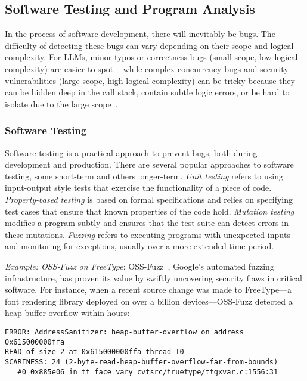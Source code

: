 \subsection{Software Testing and Program Analysis}

In the process of software development, there will inevitably be bugs. The difficulty of detecting these bugs can vary depending on their scope and logical complexity. For LLMs, minor typos or correctness bugs (small scope, low logical complexity) are easier to spot ~\citep{mosolygo2021rise} while complex concurrency bugs and security vulnerabilities (large scope, high logical complexity) can be tricky because they can be hidden deep in the call stack, contain subtle logic errors, or be hard to isolate due to the large scope~\citep{concurrencylucene}.


\subsubsection{Software Testing}
Software testing is a practical approach to prevent bugs, both during development and production.
% 
% 
There are several popular approaches to software testing, some short-term and others longer-term. \textit{Unit testing} refers to using input-output style tests that exercise the functionality of a piece of code. \textit{Property-based testing} is based on formal specifications and relies on specifying test cases that ensure that known properties of the code hold. \textit{Mutation testing} modifies a program subtly and ensures that the test suite can detect errors in these mutations. \textit{Fuzzing} refers to executing programs with unexpected inputs and monitoring for exceptions, usually over a more extended time period. 


\begin{tcolorbox}[colback=lightblue, boxrule=0pt, arc=5pt, outer arc=5pt]
\textit{Example: OSS-Fuzz on FreeType}: OSS-Fuzz~\citep{ossfuzzllm-results}, Google's automated fuzzing infrastructure, has proven its value by swiftly uncovering security flaws in critical software. For instance, when a recent source change was made to FreeType—a font rendering library deployed on over a billion devices—OSS-Fuzz detected a heap-buffer-overflow within hours:
\begin{verbatim}
ERROR: AddressSanitizer: heap-buffer-overflow on address 0x615000000ffa 
READ of size 2 at 0x615000000ffa thread T0
SCARINESS: 24 (2-byte-read-heap-buffer-overflow-far-from-bounds)
   #0 0x885e06 in tt_face_vary_cvtsrc/truetype/ttgxvar.c:1556:31
\end{verbatim}
\end{tcolorbox}

